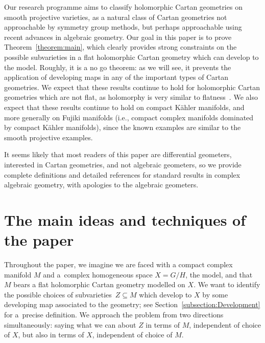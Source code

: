 \documentclass[10pt,a4paper]{amsart}
\numberwithin{equation}{section}
\begin{document}
Our research programme aims to classify holomorphic Cartan geometries on smooth projective varieties, as a natural class of Cartan
geometries not approachable by symmetry group methods, but perhaps approachable using recent advances in algebraic geometry. Our goal in
this paper is to prove Theorem~\ref{theorem:main}, which clearly provides strong constraints on the possible subvarieties in a flat
holomorphic Cartan geometry which can develop to the model. Roughly, it is a no go theorem: as we will see, it prevents the application of
developing maps in any of the important types of Cartan geometries. We expect that these results continue to hold for holomorphic Cartan
geometries which are not flat, as holomorphy is very similar to flatness~\cite{Atiyah:1957}. We also expect that these results continue to
hold on compact K\"ahler manifolds, and more generally on Fujiki manifolds (i.e., compact complex manifolds dominated by compact K\"ahler
manifolds), since the known examples are similar to the smooth projective examples.

It seems likely that most readers of this paper are differential geometers, interested in Cartan geometries, and not algebraic geometers,
so we provide complete definitions and detailed references for standard results in complex algebraic geometry, with apologies to the
algebraic geometers.

\section{The main ideas and techniques of the paper}

Throughout the paper, we imagine we are faced with a compact complex manifold $M$ and a~complex homogeneous space $X = G/H$, the model,
and that $M$ bears a flat holomorphic Cartan geometry modelled on $X$. We want to identify the possible choices of subvarieties~$Z \subseteq M$ which develop to $X$ by some developing map associated to the geometry; see Section~\ref{subsection:Development}
for a~precise definition. We approach the problem from two directions simultaneously: saying what we can about $Z$ in terms of $M$,
independent of choice of $X$, but also in terms of $X$, independent of choice of $M$.
\end{document}
